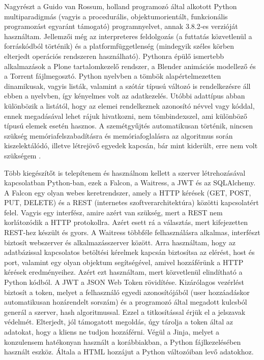 Nagyrészt a Guido van Rossum, holland programozó által alkotott Python multiparadigmás 
(vagyis a procedurális, objektumorientált, funkcionális programozást egyaránt támogató)
programnyelvet, annak 3.8.2-es verzióját használtam. Jellemzői még az interpreteres 
feldolgozás (a futtatás közvetlenül a forráskódból történik) és a platformfüggetlenség 
(mindegyik széles körben elterjedt operációs rendszeren használható). Pythonra épülő
ismertebb alkalmazások a Plone tartalomkezelő rendszer, a Blender animációs modellező
és a Torrent fájlmegosztó. Python nyelvben a tömbök alapértelmezetten dinamikusak, vagyis
listák, valamint a szótár típusú változó is rendelkezésre áll ebben a nyelvben, így 
kényelmes volt az adatkezelés. Utóbbi adattípus abban különbözik a listától, hogy az 
elemei rendelkeznek azonosító névvel vagy kóddal, ennek megadásával lehet rájuk hivatkozni, 
nem tömbindexszel, ami különböző típusú elemek esetén hasznos. A szemétgyűjtés 
automatikusan történik, nincsen szükség memóriafelszabadításra és memóriafoglalásra az 
algoritmus során kiszelektálódó, illetve létrejövő egyedek kapcsán, bár mint kiderült,
erre nem volt szükségem \cite{van2007python}.


Több kiegészítőt is telepítenem és használnom kellett a szerver létrehozásával kapcsolatban Python-ban, ezek a Falcon, a Waitress, a JWT és az SQLAlchemy. A Falcon egy olyan webes keretrendszer, amely a HTTP kérések (GET, POST, PUT, DELETE) és a REST (internetes szoftverarchitektúra) közötti  kapcsolatért felel. Vagyis egy interfész, amire azért van szükség, mert a REST nem korlátozódik a HTTP protokollra. Azért esett rá a választás, mert kifejezetten REST-hez készült és gyors. A Waitress többféle felhasználásra alkalmas, interfészt biztosít webszerver és alkalmazásszerver között. Arra használtam, hogy az adatbázissal kapcsolatos betöltési kérelmek kapcsán biztosítsa az elérést, host és port, valamint egy olyan objektum segítségével, amivel hozzáférünk a HTTP kérések eredményeihez. Azért ezt használtam, mert közvetlenül elindítható a Python kódból. A JWT a JSON Web Token rövidítése. Kizárólagos vezérlést biztosít a token, melyet a felhasználó egyedi azonosítójából (user hozzáadáskor automatikusan hozárendelt sorszám) és a programozó által megadott kulcsból generál a szerver, hash algoritmussal. Ezzel a titkosítással érjük el a jelszavak védelmét. Elterjedt, jól támogatott megoldás, úgy tárolja a token által az adatokat, hogy a kliens ne tudjon hozzáférni. Végül a Jinja, melyet a konzulensem hatékonyan használt a korábbiakban, a Python fájlkezelésében használt eszköz. Általa a HTML hozzájut a Python változóiban levő adatokhoz.

